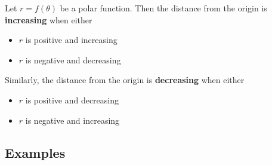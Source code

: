 \documentclass{exam}
\begin{document}
\newpage
\begin{tcolorbox}[title=Defintion: \textit{Distance from the Origin},title filled,colframe=black,sharpish corners,width=\linewidth]
    Let $r=f(\theta)$ be a polar function. Then the distance from the origin is \textbf{increasing} when either
    \begin{itemize}
        \item $r$ is positive and increasing
        \item $r$ is negative and decreasing
    \end{itemize}
    Similarly, the distance from the origin is \textbf{decreasing} when either
    \begin{itemize}
        \item $r$ is positive and decreasing
        \item $r$ is negative and increasing
    \end{itemize}

\end{tcolorbox}
\subsection*{Examples}
\end{document}
